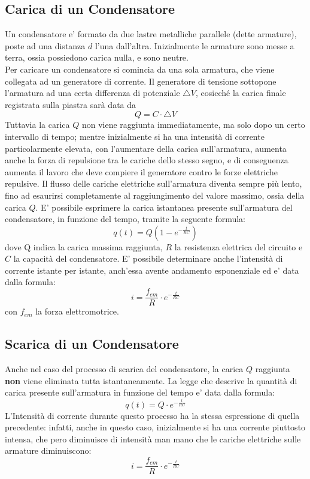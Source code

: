 \documentclass[a4paper, 10pt]{article}
\begin{document}
		\subsection{Carica di un Condensatore}
			Un condensatore e' formato da due lastre metalliche parallele (dette armature), poste ad una distanza $d$ l'una 
			dall'altra. Inizialmente le armature sono messe a terra, ossia possiedono carica nulla, e sono neutre. \\
			Per caricare un condensatore si comincia da una sola armatura, che viene collegata ad un generatore di corrente. 
			Il generatore di tensione sottopone l'armatura ad una certa differenza di potenziale $\triangle V$, cosicché 
			la carica finale registrata sulla piastra sarà data da \[ Q = C \cdot \triangle V \]
			Tuttavia la carica $Q$ non viene raggiunta immediatamente, ma solo dopo un certo intervallo di tempo; mentre
			inizialmente si ha una intensità di corrente particolarmente elevata, con l'aumentare della carica sull'armatura,
			aumenta anche la forza di repulsione tra le cariche dello stesso segno, e di conseguenza aumenta il lavoro che deve 
			compiere il generatore contro le forze elettriche repulsive. Il flusso delle cariche elettriche sull'armatura
			diventa sempre più lento, fino ad esaurirsi completamente al raggiungimento del valore massimo, ossia della 
			carica $Q$. E' possibile esprimere la carica istantanea presente sull'armatura del condensatore, in funzione 
			del tempo, tramite la seguente formula: \[q(t) = Q(1 - e^{- \frac{t}{RC}}) \] dove Q indica la carica massima
			raggiunta, $R$ la resistenza elettrica del circuito e $C$ la capacità del condensatore. E' possibile determinare anche
			l'intensità di corrente istante per istante, anch'essa avente andamento esponenziale ed e' data dalla formula:
			\[ i = \frac{f_{em}}{R} \cdot e^{-\frac{t}{RC}} \] con $f_{em}$ la forza elettromotrice.
		\subsection{Scarica di un Condensatore}
			Anche nel caso del processo di scarica del condensatore, la carica $Q$ raggiunta \textbf{non} viene eliminata
			tutta istantaneamente. La legge che descrive la quantità di carica presente sull'armatura in funzione del tempo e' 
			data dalla formula:
			\[ q(t) = Q \cdot e^{-\frac{t}{RC}} \]
			L'Intensità di corrente durante questo processo ha la stessa espressione di quella precedente: infatti, anche in 
			questo caso, inizialmente si ha una corrente piuttosto intensa, che pero diminuisce di intensità man 
			mano che le cariche elettriche sulle armature diminuiscono:
			\[ i = \frac{f_{em}}{R} \cdot e^{-\frac{t}{RC}} \]
	
\end{document}
